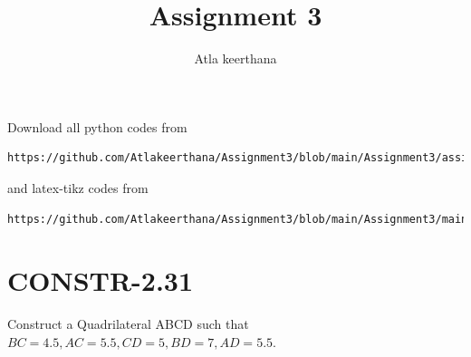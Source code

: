\documentclass[journal,12pt,twocolumn]{IEEEtran}
\begin{document}
     \def\rightbox#1{\makebox[0in][r]{#1}}
     \def\centbox#1{\makebox[0in]{#1}}
     \def\topbox#1{\raisebox{-\baselineskip}[0in][0in]{#1}}
     \def\midbox#1{\raisebox{-0.5\baselineskip}[0in][0in]{#1}}
%
\title{Assignment 3} 
\author{Atla keerthana}
\maketitle
\newpage
\bigskip
\renewcommand{\thefigure}{\theenumi}
\renewcommand{\thetable}{\theenumi}
Download all python codes from 
\begin{lstlisting}
https://github.com/Atlakeerthana/Assignment3/blob/main/Assignment3/assignment3.py
\end{lstlisting}
%
and latex-tikz codes from 
%
\begin{lstlisting}
https://github.com/Atlakeerthana/Assignment3/blob/main/Assignment3/main.tex
\end{lstlisting}
%
\section{CONSTR-2.31}
Construct a Quadrilateral ABCD such that $BC =4.5,AC =5.5,CD =5,BD =7,AD=5.5$.
\end{document}
